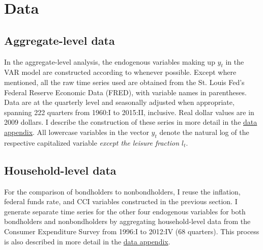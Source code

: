 \section{Data}

\subsection{Aggregate-level data}
\label{aggregate-data}

In the aggregate-level analysis, the endogenous variables making up $y_t$ in the VAR model are constructed according to \cite{collard11} whenever possible. Except where mentioned, all the raw time series used are obtained from the St. Louis Fed's Federal Reserve Economic Data (FRED), with variable names in parentheses. Data are at the quarterly level and seasonally adjusted when appropriate, spanning 222 quarters from 1960:I to 2015:II, inclusive. Real dollar values are in 2009 dollars. I describe the construction of these series in more detail in the \hyperref[aggregate-data-appendix]{data appendix}. All lowercase variables in the vector $y_t$ denote the natural log of the respective capitalized variable \textit{except the leisure fraction $l_t$}.



\subsection{Household-level data}
\label{household-data}

For the comparison of bondholders to nonbondholders, I reuse the inflation, federal funds rate, and CCI variables constructed in the previous section. I generate separate time series for the other four endogenous variables for both bondholders and nonbondholders by aggregating household-level data from the Consumer Expenditure Survey from 1996:I to 2012:IV (68 quarters). This process is also described in more detail in the \hyperref[household-data-appendix]{data appendix}.

